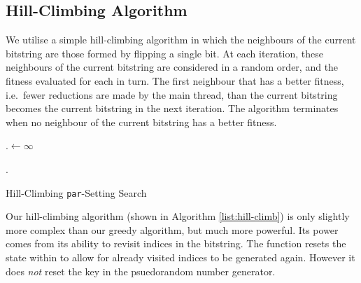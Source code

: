 \subsection{Hill-Climbing Algorithm}

We utilise a simple hill-climbing algorithm in which the neighbours of the
current bitstring are those formed by flipping a single bit.  At each
iteration, these neighbours of the current bitstring are considered in a random
order, and the fitness evaluated for each in turn. The first neighbour that has
a better fitness, i.e.~fewer reductions are made by the main thread, than the
current bitstring becomes the current bitstring in the next iteration.  The
algorithm terminates when no neighbour of the current bitstring has a better
fitness.

\begin{algorithm}
\DontPrintSemicolon
{}

\BlankLine

\Best.\Fitness $\leftarrow \infty$
\BlankLine

\BlankLine
\Return \Best.\Setting\;
\caption{Hill-Climbing \texttt{par}-Setting Search}
\label{list:hill-climb}
\end{algorithm}

Our hill-climbing algorithm (shown in Algorithm \ref{list:hill-climb}) is only
slightly more complex than our greedy algorithm, but much more powerful. Its
power comes from its ability to revisit indices in the bitstring. The function
 resets the state within  to allow for
already visited indices to be generated again. However it does \emph{not} reset
the key in the psuedorandom number generator.

